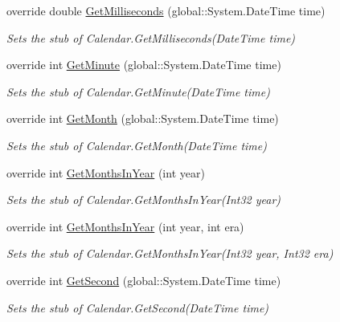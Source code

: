 \begin{DoxyCompactItemize}
override double \hyperlink{class_system_1_1_globalization_1_1_fakes_1_1_stub_calendar_a4b5f1d8a5e5f7f7f84ed33a584d182d6}{Get\-Milliseconds} (global\-::\-System.\-Date\-Time time)
\begin{DoxyCompactList}\small\item\em Sets the stub of Calendar.\-Get\-Milliseconds(\-Date\-Time time)\end{DoxyCompactList}\item 
override int \hyperlink{class_system_1_1_globalization_1_1_fakes_1_1_stub_calendar_a2f22ff1d8be414ea641d4b0b94fec5ac}{Get\-Minute} (global\-::\-System.\-Date\-Time time)
\begin{DoxyCompactList}\small\item\em Sets the stub of Calendar.\-Get\-Minute(\-Date\-Time time)\end{DoxyCompactList}\item 
override int \hyperlink{class_system_1_1_globalization_1_1_fakes_1_1_stub_calendar_a546e52737b6ad3924d58685fef469e1c}{Get\-Month} (global\-::\-System.\-Date\-Time time)
\begin{DoxyCompactList}\small\item\em Sets the stub of Calendar.\-Get\-Month(\-Date\-Time time)\end{DoxyCompactList}\item 
override int \hyperlink{class_system_1_1_globalization_1_1_fakes_1_1_stub_calendar_a52488de66c2c0e98c8f512690daac860}{Get\-Months\-In\-Year} (int year)
\begin{DoxyCompactList}\small\item\em Sets the stub of Calendar.\-Get\-Months\-In\-Year(\-Int32 year)\end{DoxyCompactList}\item 
override int \hyperlink{class_system_1_1_globalization_1_1_fakes_1_1_stub_calendar_a621c9210bd762b7ccafec6eff3b3b657}{Get\-Months\-In\-Year} (int year, int era)
\begin{DoxyCompactList}\small\item\em Sets the stub of Calendar.\-Get\-Months\-In\-Year(\-Int32 year, Int32 era)\end{DoxyCompactList}\item 
override int \hyperlink{class_system_1_1_globalization_1_1_fakes_1_1_stub_calendar_a54f3a8c36d5a5223b93712eb8ddebe12}{Get\-Second} (global\-::\-System.\-Date\-Time time)
\begin{DoxyCompactList}\small\item\em Sets the stub of Calendar.\-Get\-Second(\-Date\-Time time)\end{DoxyCompactList}\item 

\end{DoxyCompactItemize}
